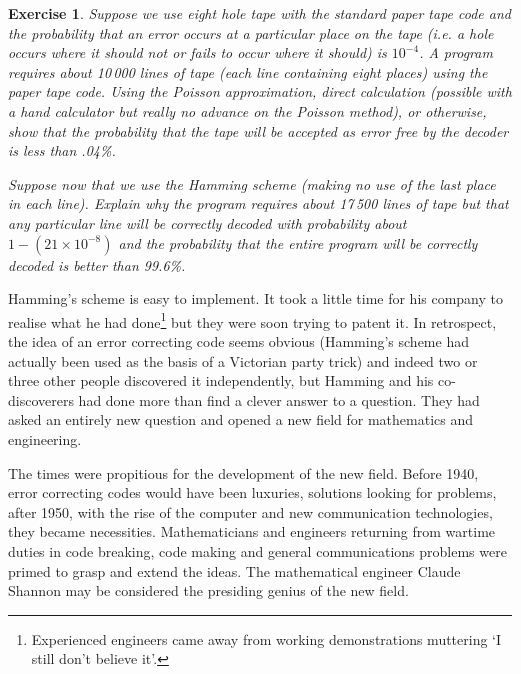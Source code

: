 \documentclass[12pt,a4paper]{article}
\theoremstyle{plain}
\newtheorem{exercise}[theorem]{Exercise}
\theoremstyle{definition}
\begin{document}
    \begin{exercise}
        \label{bacon}
        Suppose we use eight hole tape with
        the standard paper tape code
        and the probability that an error occurs at a particular
        place on the tape (i.e. a hole occurs where it should
        not or fails to occur where it should) is $10^{-4}$.
        A program requires about 10\,000 lines of tape
        (each line containing eight places)
        using the paper tape code. Using
        the Poisson approximation, direct calculation
        (possible with a hand calculator but really no
        advance on the Poisson method), or otherwise,
        show that the probability that the tape
        will be accepted as error free by the decoder
        is less than .04\%.

        Suppose now that we use the Hamming scheme
        (making no use of the last place in each line).
        Explain why the program requires about
        17\,500 lines of tape but that any
        particular line will be correctly decoded
        with probability about $1-(21\times 10^{-8})$
        and the probability that the entire program
        will be correctly decoded is better than
        99.6\%.
    \end{exercise}

    Hamming's scheme is easy to implement. It
    took a little time for his company to
    realise what he had done\footnote{Experienced engineers
    came away from working demonstrations
    muttering `I still don't believe it'.}
    but they were soon trying to patent it.
    In retrospect, the idea of an error correcting
    code seems obvious (Hamming's scheme had
    actually been used as the basis of a Victorian
    party trick) and indeed two or three other
    people discovered it independently, but Hamming
    and his
    co-discoverers had done more than
    find a clever answer to a question. They
    had asked an entirely new question and
    opened a new field for mathematics and engineering.

    The times were propitious for the development
    of the new field. Before 1940, error correcting
    codes would have been luxuries, solutions
    looking for problems, after 1950, with the
    rise of the computer and new communication
    technologies, they became necessities.
    Mathematicians and engineers returning
    from wartime duties in
    code breaking, code making and
    general communications problems were
    primed to grasp and extend the ideas.
    The mathematical engineer
    Claude Shannon may be considered the
    presiding genius of the new field.
\end{document}
